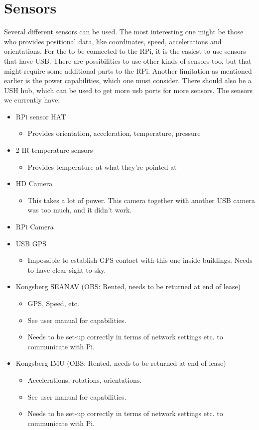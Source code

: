 \documentclass{article}
\begin{document}
\section{Sensors}
Several different sensors can be used. The most interesting one might be those who provides positional data, like coordinates, speed, accelerations and orientations.
For the to be connected to the RPi, it is the easiest to use sensors that have USB.
There are possibilities to use other kinds of sensors too, but that might require some additional parts to the RPi. Another limitation as mentioned earlier is the power capabilities, which one must consider. There should also be a USH hub, which can be used to get more usb ports for more sensors.
The sensors we currently have:
\begin{itemize}
\item 	RPi sensor HAT
\begin{itemize}
\item	Provides orientation, acceleration, temperature, pressure
\end{itemize}
\item 	2 IR temperature sensors
\begin{itemize}
\item 	Provides temperature at what they’re pointed at
\end{itemize}
\item 	HD Camera
\begin{itemize}
\item 	This takes a lot of power. This camera together with another USB camera was too much, and it didn’t work.
\end{itemize}
\item 	RPi Camera
\item 	USB GPS
\begin{itemize}
\item 	Impossible to establish GPS contact with this one inside buildings. Needs to have clear sight to sky.
\end{itemize}
\item 	Kongsberg SEANAV (OBS: Rented, needs to be returned at end of lease)
\begin{itemize}
\item 	GPS, Speed, etc.
\item 	See user manual for capabilities.
\item 	Needs to be set-up correctly in terms of network settings etc. to communicate with Pi.
\end{itemize}
\item 	Kongsberg IMU (OBS: Rented, needs to be returned at end of lease)
\begin{itemize}
\item 	Accelerations, rotations, orientations.
\item 	See user manual for capabilities.
\item 	Needs to be set-up correctly in terms of network settings etc. to communicate with Pi.
\end{itemize}
\end{itemize}
\end{document}
